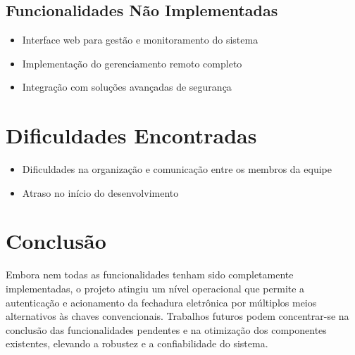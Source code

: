 \documentclass{article}
\begin{document}
\subsection*{Funcionalidades Não Implementadas}
\begin{itemize}
    \item Interface web para gestão e monitoramento do sistema
    \item Implementação do gerenciamento remoto completo
    \item Integração com soluções avançadas de segurança
\end{itemize}

\section*{Dificuldades Encontradas}
\begin{itemize}
    \item Dificuldades na organização e comunicação entre os membros da equipe
    \item Atraso no início do desenvolvimento
\end{itemize}

\section*{Conclusão}
Embora nem todas as funcionalidades tenham sido completamente implementadas, o projeto atingiu um nível operacional que permite a autenticação e acionamento da fechadura eletrônica por múltiplos meios alternativos às chaves convencionais. Trabalhos futuros podem concentrar-se na conclusão das funcionalidades pendentes e na otimização dos componentes existentes, elevando a robustez e a confiabilidade do sistema.
\end{document}
